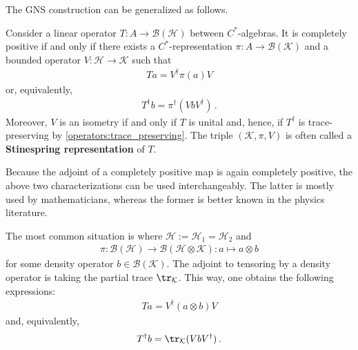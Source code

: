     The GNS construction can be generalized as follows.
    \begin{theorem}\label{operators:stinespring}
        Consider a linear operator $T:A\rightarrow\mathcal{B}(\mathcal{H})$ between $C^*$-algebras. It is completely positive if and only if there exists a $C^*$-representation $\pi:A\rightarrow\mathcal{B}(\mathcal{K})$ and a bounded operator $V:\mathcal{H}\rightarrow\mathcal{K}$ such that
        \begin{gather}
            Ta = V^\dag\pi(a)V
        \end{gather}
        or, equivalently,
        \begin{gather}
            T^\dagger b = \pi^\dagger(VbV^\dagger)\,.
        \end{gather}
        Moreover, $V$ is an isometry if and only if $T$ is unital and, hence, if $T^\dagger$ is trace-preserving by \cref{operators:trace_preserving}. The triple $(\mathcal{K},\pi,V)$ is often called a \textbf{Stinespring representation} of $T$.
    \end{theorem}
    \begin{remark}
        Because the adjoint of a completely positive map is again completely positive, the above two characterizations can be used interchangeably. The latter is mostly used by mathematicians, whereas the former is better known in the physics literature.

        The most common situation is where $\mathcal{H}:=\mathcal{H}_1=\mathcal{H}_2$ and
        \begin{gather}
            \pi:\mathcal{B}(\mathcal{H})\rightarrow\mathcal{B}(\mathcal{H}\otimes\mathcal{K}):a\mapsto a\otimes b
        \end{gather}
        for some density operator $b\in\mathcal{B}(\mathcal{K})$. The adjoint to tensoring by a density operator is taking the partial trace $\tr_{\mathcal{K}}$. This way, one obtains the following expressions:
        \begin{gather}
            Ta = V^\dag(a\otimes b)V
        \end{gather}
        and, equivalently,
        \begin{gather}
            T^\dagger b = \tr_{\mathcal{K}}(VbV^\dagger)\,.
        \end{gather}
    \end{remark}

